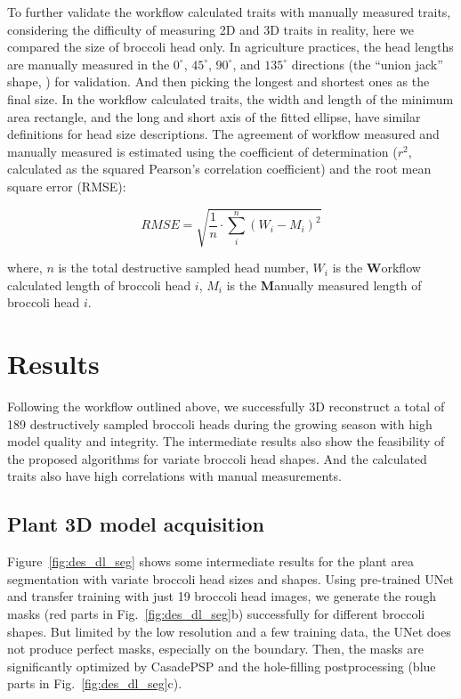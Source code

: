 To further validate the workflow calculated traits with manually measured traits, considering the difficulty of measuring 2D and 3D traits in reality, here we compared the size of broccoli head only. In agriculture practices, the head lengths are manually measured in the $0^\circ$, $45^\circ$, $90^\circ$, and $135^\circ$ directions (the ``union jack'' shape, ) for validation. And then picking the longest and shortest ones as the final size. In the workflow calculated traits, the width and length of the minimum area rectangle, and the long and short axis of the fitted ellipse, have similar definitions for head size descriptions. The agreement of workflow measured and manually measured is estimated using the coefficient of determination ($r^2$, calculated as the squared Pearson's correlation coefficient) and the root mean square error (RMSE):

\begin{equation}
  RMSE = \sqrt{\frac{1}{n} \cdot \sum_{i}^{n} (W_{i} - M_{i})^2}
\end{equation}

\noindent
where, $n$ is the total destructive sampled head number, $W_{i}$ is the \textbf{W}orkflow calculated length of broccoli head $i$, $M_{i}$ is the \textbf{M}anually measured length of broccoli head $i$.

\section{Results}

Following the workflow outlined above, we successfully 3D reconstruct a total of 189 destructively sampled broccoli heads during the growing season with high model quality and integrity. The intermediate results also show the feasibility of the proposed algorithms for variate broccoli head shapes. And the calculated traits also have high correlations with manual measurements.

\subsection{Plant 3D model acquisition}

Figure~\ref{fig:des_dl_seg} shows some intermediate results for the plant area segmentation with variate broccoli head sizes and shapes. Using pre-trained UNet and transfer training with just 19 broccoli head images, we generate the rough masks (red parts in Fig.~\ref{fig:des_dl_seg}b) successfully for different broccoli shapes. But limited by the low resolution and a few training data, the UNet does not produce perfect masks, especially on the boundary. Then, the masks are significantly optimized by CasadePSP and the hole-filling postprocessing (blue parts in Fig.~\ref{fig:des_dl_seg}c).

